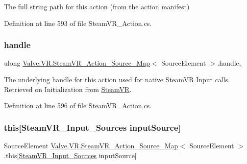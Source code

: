 The full string path for this action (from the action manifest) 



Definition at line 593 of file Steam\+V\+R\+\_\+\+Action.\+cs.

\mbox{\label{class_valve_1_1_v_r_1_1_steam_v_r___action___source___map_a6bc926f32341c260d49d8f270993adf0}} 
\subsubsection{\texorpdfstring{handle}{handle}}
{\footnotesize\ttfamily ulong \mbox{\hyperlink{class_valve_1_1_v_r_1_1_steam_v_r___action___source___map}{Valve.\+V\+R.\+Steam\+V\+R\+\_\+\+Action\+\_\+\+Source\+\_\+\+Map}}$<$ Source\+Element $>$.handle\hspace{0.3cm}{\ttfamily [get]}, {}}



The underlying handle for this action used for native \mbox{\hyperlink{class_valve_1_1_v_r_1_1_steam_v_r}{Steam\+VR}} Input calls. Retrieved on Initialization from \mbox{\hyperlink{class_valve_1_1_v_r_1_1_steam_v_r}{Steam\+VR}}. 



Definition at line 596 of file Steam\+V\+R\+\_\+\+Action.\+cs.

\mbox{\label{class_valve_1_1_v_r_1_1_steam_v_r___action___source___map_a71b9fc1c80b8d185d7f07833f18cadc5}} 
\subsubsection{\texorpdfstring{this[SteamVR\_Input\_Sources inputSource]}{this[SteamVR\_Input\_Sources inputSource]}}
{\footnotesize\ttfamily Source\+Element \mbox{\hyperlink{class_valve_1_1_v_r_1_1_steam_v_r___action___source___map}{Valve.\+V\+R.\+Steam\+V\+R\+\_\+\+Action\+\_\+\+Source\+\_\+\+Map}}$<$ Source\+Element $>$.this\mbox{[}\mbox{\hyperlink{namespace_valve_1_1_v_r_a82e5bf501cc3aa155444ee3f0662853f}{Steam\+V\+R\+\_\+\+Input\+\_\+\+Sources}} input\+Source\mbox{]}\hspace{0.3cm}{\ttfamily [get]}}



